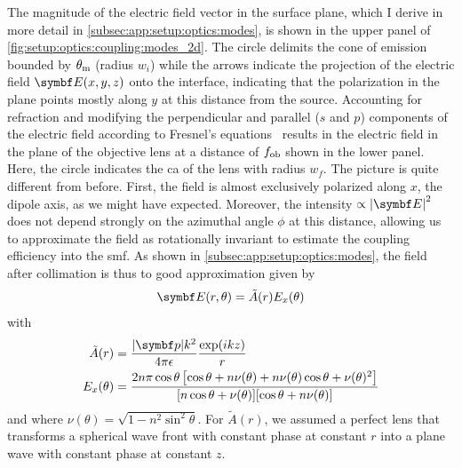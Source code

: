 The magnitude of the electric field vector in the surface plane, which I derive in more detail in \cref{subsec:app:setup:optics:modes}, is shown in the upper panel of \cref{fig:setup:optics:coupling:modes_2d}.
The circle delimits the cone of emission bounded by $\theta_{\mathrm{m}}$ (radius $w_i$) while the arrows indicate the projection of the electric field $\bvec{E}(x, y, z)$ onto the interface, indicating that the polarization in the plane points mostly along $y$ at this distance from the source.
Accounting for refraction and modifying the perpendicular and parallel ($s$ and $p$) components of the electric field according to Fresnel's equations~\cite{Hecht2017} results in the electric field in the plane of the objective lens at a distance of $f_{\mathrm{ob}}$ shown in the lower panel.
Here, the circle indicates the \gls{ca} of the lens with radius $w_f$.
The picture is quite different from before.
First, the field is almost exclusively polarized along $x$, the dipole axis, as we might have expected.
Moreover, the intensity $\propto\abs{\bvec{E}}^2$ does not depend strongly on the azimuthal angle $\phi$ at this distance, allowing us to approximate the field as rotationally invariant to estimate the coupling efficiency into the \gls{smf}.
As shown in \cref{subsec:app:setup:optics:modes}, the field after collimation is thus to good approximation given by
\begin{equation}\label{eq:setup:optics:coupling:efield:lens}
    \bvec{E}(r, \theta) = \tilde{A}(r)E_x(\theta)
\end{equation}
with
\begin{align}
    \tilde{A}(r) &= \frac{\abs{\bvec{p}}k^2}{4\pi\epsilon}\frac{\exp(\i k z)}{r} \\
    E_x(\theta) &= \frac{2n\pi\cos\theta\left[\cos\theta + n\nu(\theta) + n\nu(\theta)\cos\theta + \nu(\theta)^2\right]}{[n\cos\theta + \nu(\theta)][\cos\theta + n\nu(\theta)]} \label{eq:setup:optics:coupling:efield:lens:x}
\end{align}
and where $\nu(\theta) = \sqrt{1 - n^2\sin^2\theta}$.
For $\tilde{A}(r)$, we assumed a perfect lens that transforms a spherical wave front with constant phase at constant $r$ into a plane wave with constant phase at constant $z$.


